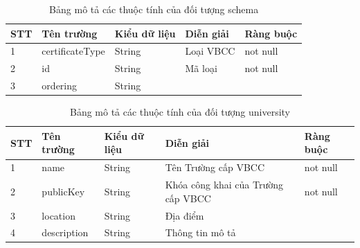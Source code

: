 \begin{enumerate}
\begin{table}[H]
\caption{Bảng mô tả các thuộc tính của đối tượng schema}
	\label{table:assetschema}
	\begin{tabularx} {\textwidth} {|p{1cm}|p{3cm}|p{3cm}|X|p{2cm}|}
\hline
		STT &	Tên trường & Kiểu dữ liệu & Diễn giải & Ràng buộc \\ \hline
		1 & certificateType	& String & Loại VBCC  & not null \\ \hline
		2 & id  & String  & Mã loại  & not null \\ \hline
		3 & ordering	&  String &   & \\ \hline
	\end{tabularx}
\end{table}


\begin{table}[H]
\caption{Bảng mô tả các thuộc tính của đối tượng university}
	\label{table:assetuniversity}
	\begin{tabularx} {\textwidth} {|p{1cm}|p{3cm}|p{3cm}|X|p{2cm}|}
\hline
		STT &	Tên trường & Kiểu dữ liệu & Diễn giải & Ràng buộc \\ \hline
		1 & name	& String & Tên Trường cấp VBCC  & not null \\ \hline
		2 & publicKey & String  & Khóa công khai của Trường cấp VBCC  & not null \\ \hline
		3 & location	&  String & Địa điểm  & \\ \hline
		4 & description	& String & Thông tin mô tả  & \\ \hline
\end{tabularx}
\end{table}

\end{enumerate}
